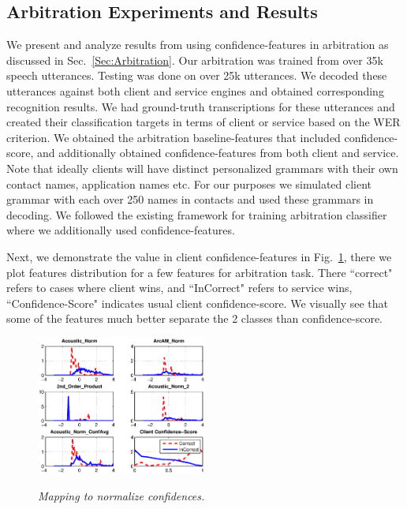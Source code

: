 
\subsection{Arbitration Experiments and Results}\label{Sec:ArbitrationResults}
We present and analyze results from using confidence-features in arbitration as discussed in Sec.~\ref{Sec:Arbitration}.
Our arbitration was trained from over 35k speech utterances. Testing was done on over 25k utterances. 
We decoded these utterances against both client and service engines and obtained corresponding recognition results.
We had ground-truth transcriptions for these utterances and created their classification targets in terms of client or service based on the WER criterion. We obtained the arbitration baseline-features that included confidence-score, and additionally obtained confidence-features from both client and service. Note that ideally clients will have distinct personalized grammars with their own contact names, application names etc. For our purposes we simulated client grammar with each over 250 names in contacts and used these grammars in decoding. We followed the existing framework for training arbitration classifier where we additionally used confidence-features.

Next, we demonstrate the value in client confidence-features in Fig.~\ref{Fig:PhrasePreds-Hist}, there we plot features distribution for a few features for arbitration task. There ``correct" refers to cases where client wins, and ``InCorrect" refers to service wins, ``Confidence-Score" indicates usual client confidence-score. We visually see that some of the features much better separate the 2 classes than confidence-score.

\begin{figure}[h]
\centering
{\includegraphics[width=0.5\textwidth]{PhrasePreds-Hist.eps}}
\caption{\it Mapping to normalize confidences.}
\label{Fig:PhrasePreds-Hist}
\end{figure}

